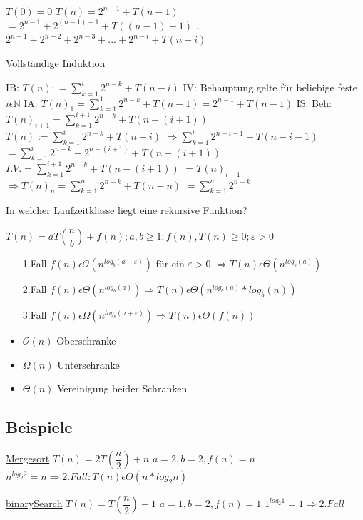 \documentclass[paper=a4, fontsize=11pt]{scrartcl}
\numberwithin{equation}{section}
\numberwithin{figure}{section}
\numberwithin{table}{section}
\begin{document}
$T(0)=0$
$T(n) = 2^{n-1} + T(n-1)$
$= 2^{n-1}+2^{(n-1)-1}+T((n-1)-1)$
...
$2^{n-1}+2^{n-2}+2^{n-3}+ ... + 2^{n-i}+T(n-i)$

\underline{Vollständige Induktion}

IB: $T(n): = \sum^{i}_{k=1}2^{n-k}+T(n-i)$
IV: Behauptung gelte für beliebige feste $i \epsilon \mathbb{N}$
IA: $T(n)_{1} = \sum^{1}_{k=1} 2^{n-k}+T(n-1) = 2^{n-1}+T(n-1)$
IS: Beh: $T(n)_{i+1}= \sum^{i+1}_{k=1} 2^{n-k} + T(n-(i+1))$
$T(n):= \sum^{i}_{k=1} 2^{n-k}+ T(n-i)$
$\Rightarrow \sum^{i}_{k=1} 2^{n-i-1}+ T(n-i-1)$
$= \sum^{i}_{k=1} 2^{n-k} + 2^{n-(i+1)}+T(n-(i+1))$
$I.V.= \sum^{i+1}_{k=1} 2^{n-k} + T(n-(i+1))$
$= T(n)_{i+1}$
$\Rightarrow T(n)_{n} = \sum^{n}_{k=1} 2^{n-k} + T(n-n) $
$= \sum^{n}_{k=1} 2^{n-k}$

In welcher Laufzeitklasse liegt eine rekursive Funktion?

$T(n) = a T ( \dfrac{n}{b}) + f(n) ; a,b \geq 1; f(n), T(n) \geq 0; \varepsilon > 0$

\begin{itemize}
\item[1.Fall]
$f(n) \epsilon \mathcal{O}(n^{log_{b}(a - \varepsilon)})$ für ein $\varepsilon > 0$
$\Rightarrow T(n) \epsilon \Theta (n^{log_{b}(a)})$
\item[2.Fall]
$f(n) \epsilon \Theta(n^{log_{b}(a)}) \Rightarrow T(n) \epsilon \Theta(n^{log_{b}(a)} * log_{b}(n))$
\item[3.Fall]
$f(n) \epsilon \Omega(n^{log_{b}(a+ \varepsilon)}) \Rightarrow T(n) \epsilon \Theta (f(n))$
\end{itemize}

\begin{itemize}
\item $\mathcal{O}(n)$ Oberschranke
\item $\Omega(n)$ Unterschranke
\item $\Theta(n)$ Vereinigung beider Schranken
\end{itemize}

\subsection{Beispiele}
\underline{Mergesort}
$T(n)=2T( \dfrac{n}{2}) + n$
$a=2, b=2,f(n)=n$
$n^{log_{2}2}=n \Rightarrow 2.Fall: T(n) \epsilon \Theta(n*log_{2}n)$

\underline{binarySearch}
$T(n)=T(\dfrac{n}{2})+1$
$a=1,b=2,f(n)=1$
$1^{log_{2}1}=1 \Rightarrow2.Fall$

\newpage
\end{document}
